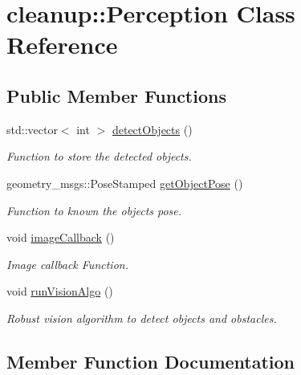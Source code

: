 \hypertarget{classcleanup_1_1_perception}{}\section{cleanup\+:\+:Perception Class Reference}
\label{classcleanup_1_1_perception}
\subsection*{Public Member Functions}
\begin{DoxyCompactItemize}
\item 
std\+::vector$<$ int $>$ \hyperlink{classcleanup_1_1_perception_a8928e5e59df7651a833505aec0cd7e4f}{detect\+Objects} ()
\begin{DoxyCompactList}\small\item\em Function to store the detected objects. \end{DoxyCompactList}\item 
geometry\+\_\+msgs\+::\+Pose\+Stamped \hyperlink{classcleanup_1_1_perception_a602ed7efc2ca9d418daa2aed25f4e3ba}{get\+Object\+Pose} ()
\begin{DoxyCompactList}\small\item\em Function to known the object\textquotesingle{}s pose. \end{DoxyCompactList}\item 
\mbox{\label{classcleanup_1_1_perception_aef837fda07b38e8746776d35925e36e4}} 
void \hyperlink{classcleanup_1_1_perception_aef837fda07b38e8746776d35925e36e4}{image\+Callback} ()
\begin{DoxyCompactList}\small\item\em Image callback Function. \end{DoxyCompactList}\item 
\mbox{\label{classcleanup_1_1_perception_aa2406cbc9ac17c40c5bcdfc9b98f369d}} 
void \hyperlink{classcleanup_1_1_perception_aa2406cbc9ac17c40c5bcdfc9b98f369d}{run\+Vision\+Algo} ()
\begin{DoxyCompactList}\small\item\em Robust vision algorithm to detect objects and obstacles. \end{DoxyCompactList}\end{DoxyCompactItemize}


\subsection{Member Function Documentation}
\mbox{\label{classcleanup_1_1_perception_a8928e5e59df7651a833505aec0cd7e4f}} 
